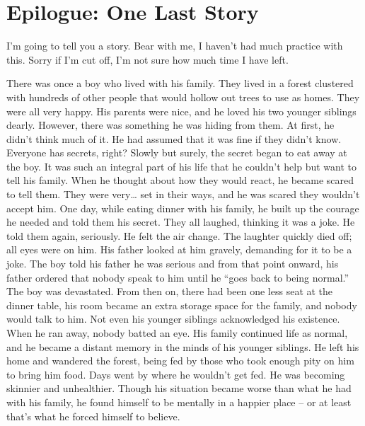 \documentclass[openany, 12pt]{book}
\newcommand\tab[1][1cm]{\hspace*{#1}}
\begin{document}
\chapter{Epilogue: One Last Story}
\tab
I’m going to tell you a story. Bear with me, I haven’t had much practice with this. Sorry if I’m cut off, I’m not sure how much time I have left.
\begin{itshape}
\newline
\newline
\tab
There was once a boy who lived with his family. They lived in a forest clustered with hundreds of other people that would hollow out trees to use as homes. They were all very happy. His parents were nice, and he loved his two younger siblings dearly. However, there was something he was hiding from them. At first, he didn’t think much of it. He had assumed that it was fine if they didn’t know. Everyone has secrets, right?
\newline
\tab
Slowly but surely, the secret began to eat away at the boy. It was such an integral part of his life that he couldn’t help but want to tell his family. When he thought about how they would react, he became scared to tell them. They were very… set in their ways, and he was scared they wouldn’t accept him.
\newline
\tab
One day, while eating dinner with his family, he built up the courage he needed and told them his secret. They all laughed, thinking it was a joke. He told them again, seriously. He felt the air change. The laughter quickly died off; all eyes were on him. His father looked at him gravely, demanding for it to be a joke. The boy told his father he was serious and from that point onward, his father ordered that nobody speak to him until he ``goes back to being normal.''
\newline
\tab
The boy was devastated. From then on, there had been one less seat at the dinner table, his room became an extra storage space for the family, and nobody would talk to him. Not even his younger siblings acknowledged his existence.
\newline
\tab
When he ran away, nobody batted an eye. His family continued life as normal, and he became a distant memory in the minds of his younger siblings. He left his home and wandered the forest, being fed by those who took enough pity on him to bring him food. Days went by where he wouldn’t get fed. He was becoming skinnier and unhealthier. Though his situation became worse than what he had with his family, he found himself to be mentally in a happier place -- or at least that’s what he forced himself to believe.

\end{itshape}
\end{document}
